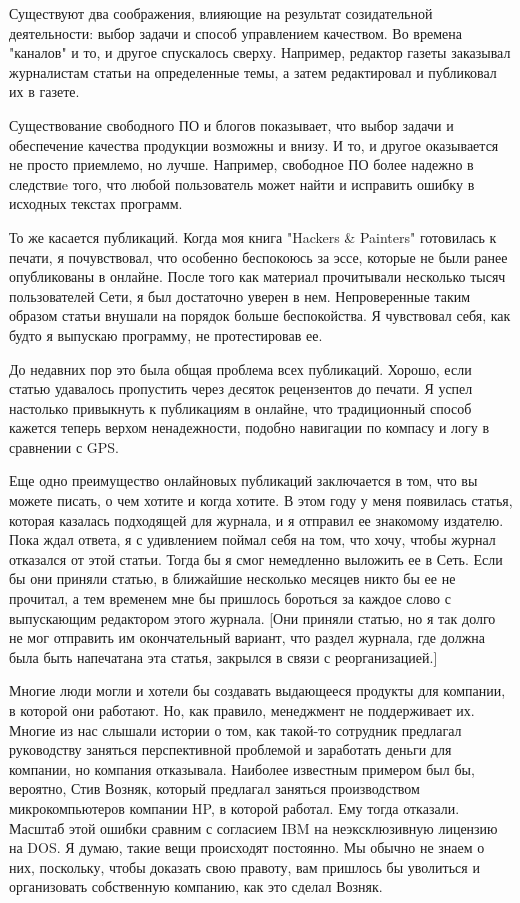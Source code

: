 \documentclass[ebook,12pt,oneside,openany]{memoir}
\begin{document}
Существуют два соображения, влияющие на результат созидательной
деятельности: выбор задачи и способ управлением качеством. Во времена
"каналов" и то, и другое спускалось сверху. Например, редактор газеты
заказывал журналистам статьи на определенные темы, а затем
редактировал и публиковал их в газете.

Существование свободного ПО и блогов показывает, что выбор задачи и
обеспечение качества продукции возможны и внизу. И то, и другое
оказывается не просто приемлемо, но лучше. Например, свободное ПО
более надежно в следствиe того, что любой пользователь может найти и
исправить ошибку в исходных текстах программ.

То же касается публикаций. Когда моя книга "Hackers \& Painters"
готовилась к печати, я почувствовал, что особенно беспокоюсь за эссе,
которые не были ранее опубликованы в онлайне. После того как материал
прочитывали несколько тысяч пользователей Сети, я был достаточно
уверен в нем. Непроверенные таким образом статьи внушали на порядок
больше беспокойства. Я чувствовал себя, как будто я выпускаю
программу, не протестировав ее.

До недавних пор это была общая проблема всех публикаций. Хорошо, если
статью удавалось пропустить через десяток рецензентов до печати. Я
успел настолько привыкнуть к публикациям в онлайне, что традиционный
способ кажется теперь верхом ненадежности, подобно навигации по
компасу и логу в сравнении с GPS.

Еще одно преимущество онлайновых публикаций заключается в том, что вы
можете писать, о чем хотите и когда хотите. В этом году у меня
появилась статья, которая казалась подходящей для журнала, и я
отправил ее знакомому издателю. Пока ждал ответа, я с удивлением
поймал себя на том, что хочу, чтобы журнал отказался от этой статьи.
Тогда бы я смог немедленно выложить ее в Сеть. Если бы они приняли
статью, в ближайшие несколько месяцев никто бы ее не прочитал, а тем
временем мне бы пришлось бороться за каждое слово с выпускающим
редактором этого журнала. [Они приняли статью, но я так долго не мог
отправить им окончательный вариант, что раздел журнала, где должна
была быть напечатана эта статья, закрылся в связи с реорганизацией.]

Многие люди могли и хотели бы создавать выдающееся продукты для
компании, в которой они работают. Но, как правило, менеджмент не
поддерживает их. Многие из нас слышали истории о том, как такой-то
сотрудник предлагал руководству заняться перспективной проблемой и
заработать деньги для компании, но компания отказывала. Наиболее
известным примером был бы, вероятно, Стив Возняк, который предлагал
заняться производством микрокомпьютеров компании HP, в которой
работал. Ему тогда отказали. Масштаб этой ошибки сравним с согласием
IBM на неэксклюзивную лицензию на DOS. Я думаю, такие вещи происходят
постоянно. Мы обычно не знаем о них, поскольку, чтобы доказать свою
правоту, вам пришлось бы уволиться и организовать собственную
компанию, как это сделал Возняк.
\end{document}
